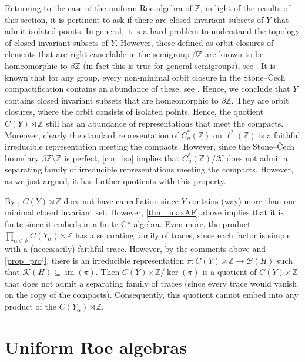 \documentclass[12pt, a4paper, oneside]{amsart}
\newcommand{\0}{\mathbf{0}}
\newcommand{\1}{\mathbf{1}}
\newcommand{\Z}{\mathbb{Z}}   %
\newcommand{\bbA}{\mathbb{A}}   %
\newcommand{\B}{\mathscr{B}}
\newcommand{\K}{\mathscr{K}}
\begin{document}
	Returning to the case of the uniform Roe algebra of \(\Z\), in light of the results of this section, it is pertinent to ask if there are closed invariant subsets of \(Y\) that admit isolated points. In general, it is a hard problem to understand the topology of closed invariant subsets of \(Y\). However, those defined as orbit closures of elements that are right cancelable in the semigroup \(\beta \Z\) are known to be homeomorphic to \(\beta \Z\) (in fact this is true for general semigroups), see \cite[Theorem 4.7]{hindman}. It is known that for any group, every non-minimal orbit closure in the Stone--\v{C}ech compactification contains an abundance of these, see \cite[Corollary 8.26]{hindman_strauss_alg}. Hence, we conclude that \(Y\) contains closed invariant subsets that are homeomorphic to \(\beta \Z\). They are orbit closures, where the orbit consists of isolated points. Hence, the quotient \(C(Y) \rtimes \Z\) still has an abundance of representations that meet the compacts. Moreover, clearly the standard representation of \(C_u^*(\Z)\) on \(\ell^2(\Z)\) is a faithful irreducible representation meeting the compacts. However, since the Stone--\v{C}ech boundary \(\beta \Z \setminus \Z\) is perfect, \cref{cor_iso} implies that \(C_u^*(\Z)/ \K\) does not admit a separating family of irreducible representations meeting the compacts. However, as we just argued, it has further quotients with this property. 
	
	By \cite[Theorem 3.1]{putnam}, \(C(Y) \rtimes \Z\) does not have cancellation since \(Y\) contains (way) more than one minimal closed invariant set. However, \cref{thm_maxAF} above implies that it is finite since it embeds in a finite C*-algebra. Even more, the product \(\prod_{\alpha \in \bbA} C(Y_\alpha) \rtimes \Z\) has a separating family of traces, since each factor is simple with a (necessarily) faithful trace. However, by the comments above and \cref{prop_proj}, there is an irreducible representation \(\pi \colon C(Y) \rtimes \Z \to \B(H)\) such that \(\K(H) \subseteq \operatorname{im} (\pi)\). Then \(C(Y) \rtimes \Z / \ker(\pi)\) is a quotient of \(C(Y) \rtimes \Z\) that does not admit a separating family of traces (since every trace would vanish on the copy of the compacts). Consequently, this quotient cannot embed into any product of the \(C(Y_\alpha) \rtimes \Z\).
	
	\section{Uniform Roe algebras}
	
\end{document}
